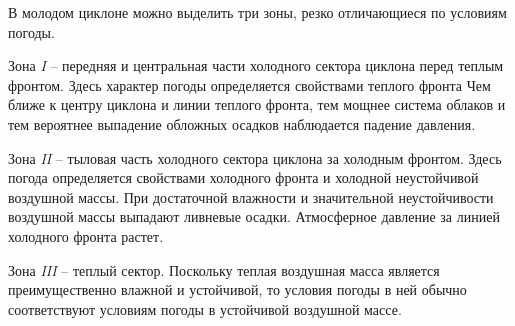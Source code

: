 \documentclass[a4paper, 12pt, twoside, final, book, russian, fittopage, cyremdash, openright]{ncc}
\begin{document}
В молодом циклоне можно выделить три зоны, резко отличающиеся по условиям погоды.

Зона \textit{I} \--- передняя и центральная части холодного сектора
циклона перед теплым фронтом. Здесь характер погоды определяется
свойствами теплого фронта Чем ближе к центру циклона и линии теплого
фронта, тем мощнее система облаков и тем вероятнее выпадение обложных
осадков наблюдается падение давления.

Зона \textit{II} \--- тыловая часть холодного сектора циклона за холодным
фронтом. Здесь погода определяется свойствами холодного фронта и
холодной неустойчивой воздушной массы. При достаточной влажности и
значительной неустойчивости воздушной массы выпадают ливневые
осадки. Атмосферное давление за линией холодного фронта растет.

Зона \textit{III} \--- теплый сектор. Поскольку теплая воздушная масса
является преимущественно влажной и устойчивой, то условия погоды в
ней обычно соответствуют условиям погоды в устойчивой воздушной массе.


\backmatter{}

\printindex
\end{document}
